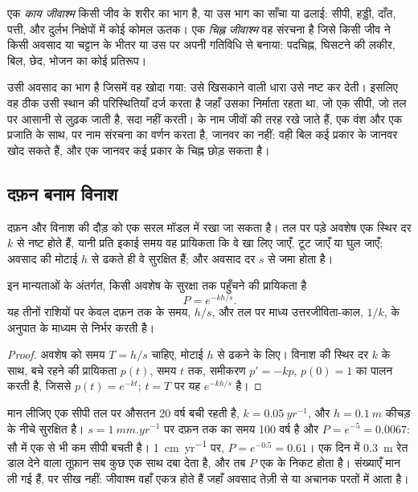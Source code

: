 \begin{definition}[काय जीवाश्म; चिह्न जीवाश्म]\label{def:b2:palaeoenvironments:fossil-kinds}
एक \emph{काय जीवाश्म} किसी जीव के शरीर का भाग है, या उस भाग का साँचा या ढलाई:
सीपी, हड्डी, दाँत, पत्ती, और दुर्लभ निक्षेपों में कोई कोमल ऊतक। एक
\emph{चिह्न जीवाश्म} वह संरचना है जिसे किसी जीव ने किसी अवसाद या चट्टान के भीतर या
उस पर अपनी गतिविधि से बनाया: पदचिह्न, घिसटने की लकीर, बिल, छेद, भोजन का कोई प्रतिरूप।
\end{definition}

 उसी अवसाद का भाग है जिसमें वह खोदा गया: उसे खिसकाने वाली धारा उसे नष्ट कर देती।
इसलिए वह ठीक उसी स्थान की परिस्थितियाँ दर्ज करता है जहाँ उसका निर्माता रहता था, जो एक सीपी,
जो तल पर आसानी से लुढ़क जाती है, सदा नहीं करती।  के नाम जीवों की तरह रखे जाते हैं, एक
वंश और एक प्रजाति के साथ, पर नाम संरचना का वर्णन करता है, जानवर का नहीं: वही बिल
कई प्रकार के जानवर खोद सकते हैं, और एक जानवर कई प्रकार के चिह्न छोड़ सकता है।

\subsection*{दफ़न बनाम विनाश}

दफ़न और विनाश की दौड़ को एक सरल मॉडल में रखा जा सकता है। तल पर पड़े अवशेष
एक स्थिर दर $k$ से नष्ट होते हैं, यानी प्रति इकाई समय वह प्रायिकता कि वे खा लिए जाएँ,
टूट जाएँ या घुल जाएँ; अवसाद की मोटाई $h$ से ढकते ही वे सुरक्षित हैं; और
अवसाद दर $s$ से जमा होता है।

\begin{proposition}[विनाश से पहले दफ़न]\label{prop:b2:palaeoenvironments:burial}
इन मान्यताओं के अंतर्गत, किसी अवशेष के सुरक्षा तक पहुँचने की प्रायिकता है
\[
  P = e^{-kh/s}.
\]
यह तीनों राशियों पर केवल दफ़न तक के समय, $h/s$, और
तल पर माध्य उत्तरजीविता-काल, $1/k$, के अनुपात के माध्यम से निर्भर करती है।
\end{proposition}

\begin{proof}
अवशेष को समय $T = h/s$ चाहिए, मोटाई $h$ से ढकने के लिए। विनाश की स्थिर दर
$k$ के साथ, बचे रहने की प्रायिकता $p(t)$, समय $t$ तक, समीकरण $p' = -kp$, $p(0) =
1$ का पालन करती है, जिससे $p(t) = e^{-kt}$; $t = T$ पर यह $e^{-kh/s}$ है।
\end{proof}

\begin{example}[एक शांत तल पर एक सीपी]\label{ex:b2:palaeoenvironments:shell}
मान लीजिए एक सीपी तल पर औसतन 20 वर्ष बची रहती है, $k = \qty{0.05}{yr^{-1}}$, और
$h = \qty{0.1}{m}$ कीचड़ के नीचे सुरक्षित है। $s = \qty{1}{mm.yr^{-1}}$ पर दफ़न तक का समय 100
वर्ष है और $P = e^{-5} = 0.0067$: सौ में एक से भी कम सीपी बचती है।
\qty{1}{cm.yr^{-1}} पर, $P = e^{-0.5} = 0.61$। एक दिन में \qty{0.3}{m} रेत डाल देने वाला तूफ़ान
सब कुछ एक साथ दबा देता है, और तब $P$ एक के निकट होता है। संख्याएँ मान ली गई हैं, पर सीख
नहीं: जीवाश्म वहाँ एकत्र होते हैं जहाँ अवसाद तेज़ी से या अचानक परतों में आता है।
\end{example}

